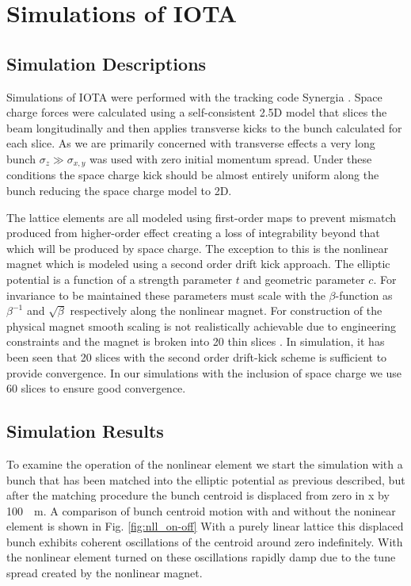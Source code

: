 \documentclass[aps,prstab,twocolumn, groupedaddress]{revtex4-1}
\begin{document}
\section{Simulations of IOTA}
\subsection{Simulation Descriptions}

Simulations of IOTA were performed with the tracking code Synergia \cite{synergia}. Space 
charge forces were calculated using a self-consistent 2.5D model that slices the beam 
longitudinally and then applies transverse kicks to the bunch calculated for each slice. As 
we are primarily concerned with transverse effects a very long bunch $\sigma_z \gg 
\sigma_{x,y}$ was used with zero initial momentum spread. Under these conditions the 
space charge kick should be almost entirely uniform along the bunch reducing the space 
charge model to 2D. 

The lattice elements are all modeled using first-order maps to prevent mismatch produced 
from higher-order effect creating a loss of integrability beyond that which will be 
produced by space charge. The exception to this is the nonlinear magnet which is 
modeled using a second order drift kick approach. The elliptic potential is a function of a 
strength parameter $t$ and geometric parameter $c$. For invariance to be maintained 
these parameters must scale with the $\beta$-function as $\beta^{-1}$ and $\sqrt{\beta}$ 
respectively along the nonlinear magnet. For construction of the physical magnet smooth 
scaling is not realistically achievable due to engineering constraints and the magnet is 
broken into 20 thin slices \cite{elliptic_magnet}. In simulation, it has been seen that 20 
slices with the second order drift-kick scheme is sufficient to provide convergence. In our 
simulations with the inclusion of space charge we use 60 slices to ensure good 
convergence.

\subsection{Simulation Results}
To examine the operation of the nonlinear element we start the simulation with a bunch 
that has been matched into the elliptic potential as previous described, but after the 
matching procedure the bunch centroid is displaced from zero in x by \SI{+100}{\mu m}. A 
comparison of bunch centroid motion with and without the noninear element is shown in 
Fig. \ref{fig:nll_on-off} With a purely linear lattice this displaced bunch exhibits coherent 
oscillations of the centroid around zero indefinitely. With the nonlinear element turned on 
these oscillations  rapidly damp due to the tune spread created by the nonlinear magnet. 
\end{document}
